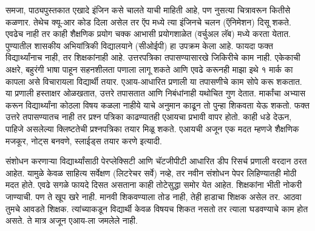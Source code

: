 समजा, पाठ्यपुस्तकात एखादे इंजिन कसे चालते याची माहिती आहे, पण नुसत्या चित्रावरून कितीसे कळणार. तेथेच क्यू-आर कोड दिला असेल तर ऍप मध्ये त्या इंजिनचे चलन (ऍनिमेशन) दिसू शकते. एवढेच नाही तर काही शैक्षणिक प्रयोग चक्क आभासी प्रयोगशाळेत (वर्चुअल लॅब) मध्ये करता येतात. पुण्यातील शासकीय अभियांत्रिकी विद्यालयाने (सीओईपी) हा उपक्रम केला आहे. फायदा फक्त विद्यार्थ्यांनाच नाही, तर शिक्षकांनाही आहे. उत्तरपत्रिका तपासण्यासारखे जिकिरीचे काम नाही. एकेकाची अक्षरे, बहुरंगी भाषा पाहून सहनशीलता पणाला लागू शकते आणि एवढे करूनही माझा इथे १ मार्क का कापला असे विचारायला विद्यार्थी तयार. एआय-आधारित प्रणाली या तपासणीचे काम सोपे करू शकतात. या प्रणाली हस्ताक्षर ओळखतात, उत्तरे तपासतात आणि निबंधांनाही यथोचित गुण देतात. मार्कांचा अभ्यास करून विद्यार्थ्यांना कोठला विषय कळला नाहीये याचे अनुमान काढून तो पुन्हा शिकवता येऊ शकतो. फक्त उत्तरे तपासण्यातच नाही तर प्रश्न पत्रिका काढण्यातही एआयचा प्रभावी वापर होतो. काही धडे देऊन, पाहिजे असलेल्या क्लिष्टतेची प्रश्नपत्रिका तयार मिळू शकते. एआयची अजून एक मदत म्हणजे शैक्षणिक मजकूर, नोट्स बनवणे, स्लाईड्स तयार करणे इत्यादी.

संशोधन करणाऱ्या विद्यार्थ्यांसाठी पेरप्लेक्सिटी आणि चॅटजीपीटी आधारित डीप रिसर्च प्रणाली वरदान ठरत आहेत. यामुळे केवळ साहित्य सर्वेक्षण (लिटरेचर सर्वे) नव्हे, तर नवीन संशोधन पेपर लिहिण्यातही मोठी मदत होते. एवढे सगळे फायदे दिसत असताना काही तोटेसुद्धा समोर येत आहेत. शिक्षकांना भीती नोकरी जाण्याची. पण ते खूप खरे नाही. मानवी शिकवण्याला तोड नाही, तेही हाडाचा शिक्षक असेल तर. आठवा तुमचे आवडते शिक्षक. त्यांच्याकडून विद्यार्थी केवळ विषयच शिकत नसतो तर त्याला घडवण्याचे काम होत असते. ते मात्र अजून एआय-ला जमलेले नाही.